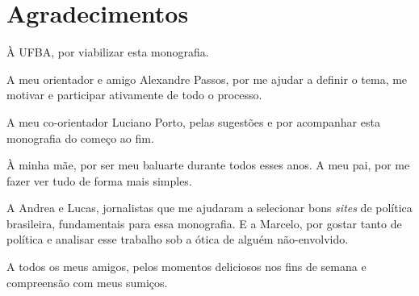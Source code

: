 \chapter*{Agradecimentos}

À UFBA, por viabilizar esta monografia.

A meu orientador e amigo Alexandre Passos, por me ajudar a definir o tema, me motivar e participar ativamente de todo o processo.

A meu co-orientador Luciano Porto, pelas sugestões e por acompanhar esta monografia do começo ao fim.

À minha mãe, por ser meu baluarte durante todos esses anos. A meu pai, por me fazer ver tudo de forma mais simples.

A Andrea e Lucas, jornalistas que me ajudaram a selecionar bons \emph{sites} de política brasileira, fundamentais para essa monografia. E a Marcelo, por gostar tanto de política e analisar esse trabalho sob a ótica de alguém não-envolvido.

A todos os meus amigos, pelos momentos deliciosos nos fins de semana e compreensão com meus sumiços.

